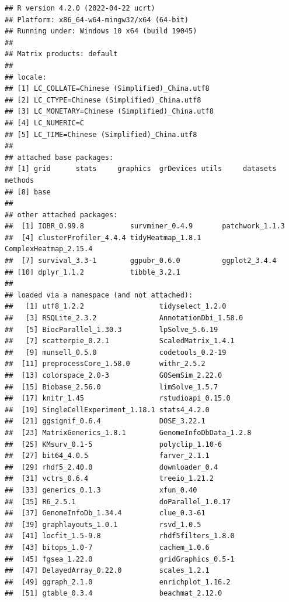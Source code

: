 \documentclass[
  12pt,
]{book}
\begin{document}
\begin{verbatim}
## R version 4.2.0 (2022-04-22 ucrt)
## Platform: x86_64-w64-mingw32/x64 (64-bit)
## Running under: Windows 10 x64 (build 19045)
## 
## Matrix products: default
## 
## locale:
## [1] LC_COLLATE=Chinese (Simplified)_China.utf8 
## [2] LC_CTYPE=Chinese (Simplified)_China.utf8   
## [3] LC_MONETARY=Chinese (Simplified)_China.utf8
## [4] LC_NUMERIC=C                               
## [5] LC_TIME=Chinese (Simplified)_China.utf8    
## 
## attached base packages:
## [1] grid      stats     graphics  grDevices utils     datasets  methods  
## [8] base     
## 
## other attached packages:
##  [1] IOBR_0.99.8           survminer_0.4.9       patchwork_1.1.3      
##  [4] clusterProfiler_4.4.4 tidyHeatmap_1.8.1     ComplexHeatmap_2.15.4
##  [7] survival_3.3-1        ggpubr_0.6.0          ggplot2_3.4.4        
## [10] dplyr_1.1.2           tibble_3.2.1         
## 
## loaded via a namespace (and not attached):
##   [1] utf8_1.2.2                  tidyselect_1.2.0           
##   [3] RSQLite_2.3.2               AnnotationDbi_1.58.0       
##   [5] BiocParallel_1.30.3         lpSolve_5.6.19             
##   [7] scatterpie_0.2.1            ScaledMatrix_1.4.1         
##   [9] munsell_0.5.0               codetools_0.2-19           
##  [11] preprocessCore_1.58.0       withr_2.5.2                
##  [13] colorspace_2.0-3            GOSemSim_2.22.0            
##  [15] Biobase_2.56.0              limSolve_1.5.7             
##  [17] knitr_1.45                  rstudioapi_0.15.0          
##  [19] SingleCellExperiment_1.18.1 stats4_4.2.0               
##  [21] ggsignif_0.6.4              DOSE_3.22.1                
##  [23] MatrixGenerics_1.8.1        GenomeInfoDbData_1.2.8     
##  [25] KMsurv_0.1-5                polyclip_1.10-6            
##  [27] bit64_4.0.5                 farver_2.1.1               
##  [29] rhdf5_2.40.0                downloader_0.4             
##  [31] vctrs_0.6.4                 treeio_1.21.2              
##  [33] generics_0.1.3              xfun_0.40                  
##  [35] R6_2.5.1                    doParallel_1.0.17          
##  [37] GenomeInfoDb_1.34.4         clue_0.3-61                
##  [39] graphlayouts_1.0.1          rsvd_1.0.5                 
##  [41] locfit_1.5-9.8              rhdf5filters_1.8.0         
##  [43] bitops_1.0-7                cachem_1.0.6               
##  [45] fgsea_1.22.0                gridGraphics_0.5-1         
##  [47] DelayedArray_0.22.0         scales_1.2.1               
##  [49] ggraph_2.1.0                enrichplot_1.16.2          
##  [51] gtable_0.3.4                beachmat_2.12.0            

\end{verbatim}
\end{document}
